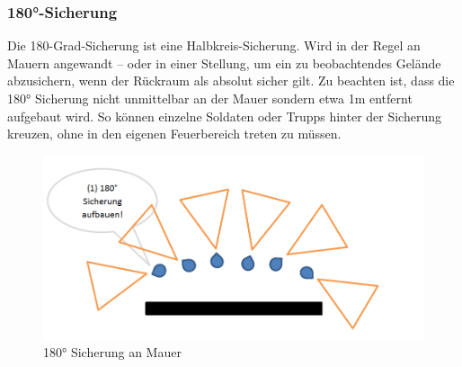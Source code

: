\subsubsection{180°-Sicherung}
	Die 180-Grad-Sicherung ist eine Halbkreis-Sicherung. Wird in der Regel an Mauern angewandt – oder in einer Stellung, um ein zu beobachtendes Gelände abzusichern, wenn der Rückraum als absolut sicher gilt. Zu beachten ist, dass die 180° Sicherung nicht unmittelbar an der Mauer sondern etwa 1m entfernt aufgebaut wird. So können einzelne Soldaten oder Trupps hinter der Sicherung kreuzen, ohne in den eigenen Feuerbereich treten zu müssen. \\
	\begin{figure}[htbp]
		\centering
		\includegraphics[width=15cm]{./img/grundlagen/sicherungen/180er.png}
		\caption{180° Sicherung an Mauer}
		\end{figure}
\newpage